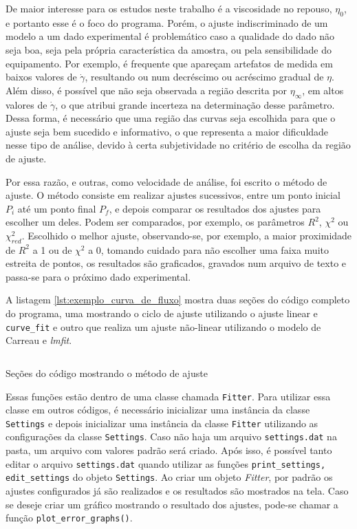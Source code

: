 		De maior interesse para os estudos neste trabalho é a viscosidade no repouso, \(\eta_0\), e portanto esse é o foco do programa. Porém, o ajuste indiscriminado de um modelo a um dado experimental é problemático caso a qualidade do dado não seja boa, seja pela própria característica da amostra, ou pela sensibilidade do equipamento. Por exemplo, é frequente que apareçam artefatos de medida em baixos valores de \(\dot{\gamma}\), resultando ou num decréscimo ou acréscimo gradual de \(\eta\). Além disso, é possível que não seja observada a região descrita por \(\eta_{\infty}\), em altos valores de \(\dot{\gamma}\), o que atribui grande incerteza na determinação desse parâmetro. Dessa forma, é necessário que uma região das curvas seja escolhida para que o ajuste seja bem sucedido e informativo, o que representa a maior dificuldade nesse tipo de análise, devido à certa subjetividade no critério de escolha da região de ajuste. %
		
		Por essa razão, e outras, como velocidade de análise, foi escrito o método de ajuste. O método consiste em realizar ajustes sucessivos, entre um ponto inicial \(P_i\) até um ponto final \(P_f\), e depois comparar os resultados dos ajustes para escolher um deles. Podem ser comparados, por exemplo, os parâmetros \(R^2\), \(\chi^2\) ou \(\chi_{red}^2\). Escolhido o melhor ajuste, observando-se, por exemplo, a maior proximidade de \(R^2\) a 1 ou de \(\chi^2\) a 0, tomando cuidado para não escolher uma faixa muito estreita de pontos, os resultados são graficados, gravados num arquivo de texto e passa-se para o próximo dado experimental.
		
		A listagem \ref{lst:exemplo_curva_de_fluxo} mostra duas seções do código completo do programa, uma mostrando o ciclo de ajuste utilizando o ajuste linear e \texttt{curve\_fit} e outro que realiza um ajuste não-linear utilizando o modelo de Carreau e \emph{lmfit}.
		
		\begin{listing}[h]
			\inputminted{python}{./python/curva_de_fluxo.py}
			\caption{Seções do código mostrando o método de ajuste}  %
			\label{lst:exemplo_curva_de_fluxo}
		\end{listing}
		
		Essas funções estão dentro de uma classe chamada \texttt{Fitter}. Para utilizar essa classe em outros códigos, é necessário inicializar uma instância da classe \texttt{Settings} e depois inicializar uma instância da classe \texttt{Fitter} utilizando as configurações da classe \texttt{Settings}. Caso não haja um arquivo \texttt{settings.dat} na pasta, um arquivo com valores padrão será criado. Após isso, é possível tanto editar o arquivo \texttt{settings.dat} quando utilizar as funções \texttt{print\_settings, edit\_settings} do objeto \texttt{Settings}. Ao criar um objeto \emph{Fitter}, por padrão os ajustes configurados já são realizados e os resultados são mostrados na tela. Caso se deseje criar um gráfico mostrando o resultado dos ajustes, pode-se chamar a função \texttt{plot\_error\_graphs()}. 
		
